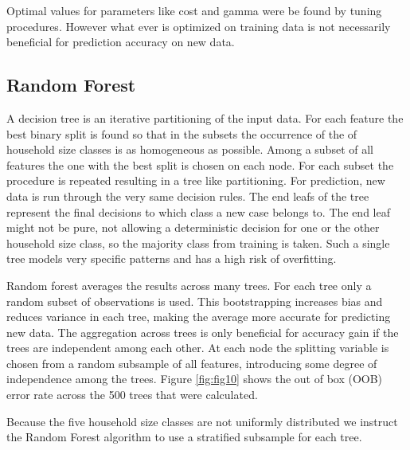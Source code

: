 \documentclass[]{article}
\newenvironment{Shaded}{\begin{snugshade}}{\end{snugshade}}
\newcommand{\DataTypeTok}[1]{\textcolor[rgb]{0.13,0.29,0.53}{#1}}
\newcommand{\DecValTok}[1]{\textcolor[rgb]{0.00,0.00,0.81}{#1}}
\newcommand{\FloatTok}[1]{\textcolor[rgb]{0.00,0.00,0.81}{#1}}
\newcommand{\KeywordTok}[1]{\textcolor[rgb]{0.13,0.29,0.53}{\textbf{#1}}}
\newcommand{\NormalTok}[1]{#1}
\newcommand{\OperatorTok}[1]{\textcolor[rgb]{0.81,0.36,0.00}{\textbf{#1}}}
\newcommand{\OtherTok}[1]{\textcolor[rgb]{0.56,0.35,0.01}{#1}}
\newcommand{\StringTok}[1]{\textcolor[rgb]{0.31,0.60,0.02}{#1}}
\begin{document}
Optimal values for parameters like cost and gamma were be found by
tuning procedures. However what ever is optimized on training data is
not necessarily beneficial for prediction accuracy on new data.

\hypertarget{random-forest}{%
\subsection{Random Forest}\label{random-forest}}

A decision tree is an iterative partitioning of the input data. For each
feature the best binary split is found so that in the subsets the
occurrence of the of household size classes is as homogeneous as
possible. Among a subset of all features the one with the best split is
chosen on each node. For each subset the procedure is repeated resulting
in a tree like partitioning. For prediction, new data is run through the
very same decision rules. The end leafs of the tree represent the final
decisions to which class a new case belongs to. The end leaf might not
be pure, not allowing a deterministic decision for one or the other
household size class, so the majority class from training is taken. Such
a single tree models very specific patterns and has a high risk of
overfitting.

Random forest averages the results across many trees. For each tree only
a random subset of observations is used. This bootstrapping increases
bias and reduces variance in each tree, making the average more accurate
for predicting new data. The aggregation across trees is only beneficial
for accuracy gain if the trees are independent among each other. At each
node the splitting variable is chosen from a random subsample of all
features, introducing some degree of independence among the trees.
Figure \ref{fig:fig10} shows the out of box (OOB) error rate across the
500 trees that were calculated.

Because the five household size classes are not uniformly distributed we
instruct the Random Forest algorithm to use a stratified subsample for
each tree.

\begin{Shaded}
\end{Shaded}
\end{document}
